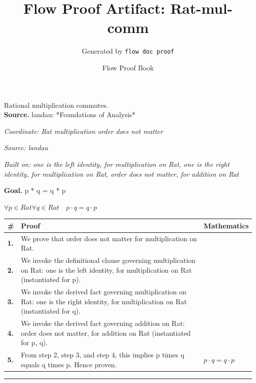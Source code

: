 \documentclass[11pt]{article}
\title{Flow Proof Artifact: Rat-mul-comm}
\author{Generated by \texttt{flow doc proof}}
\date{Flow Proof Book}
\theoremstyle{definition}
\begin{document}
\maketitle
Rational multiplication commutes.\\[0.5em]
\textbf{Source.} landau: *Foundations of Analysis*\\[0.5em]
\bigskip
{}\par
\smallskip\noindent\textit{Coordinate: Rat \cdot multiplication \cdot order does not matter}\par
\smallskip\noindent\textit{Source: landau}\par
\smallskip\noindent\textit{Built on: one is the left identity, for multiplication on Rat, one is the right identity, for multiplication on Rat, order does not matter, for addition on Rat}\par
\medskip
\noindent\textbf{Goal.} p * q = q * p\par
\noindent$\displaystyle \forall p \in Rat \forall q \in Rat\quad p \cdot q = q \cdot p$\par
\medskip
\noindent
\begin{tabular}{@{} >{\raggedright\arraybackslash}p{} >{\raggedright\arraybackslash}p{} >{\raggedleft\arraybackslash}p{} @{}}
\textbf{\#} & \textbf{Proof} & \textbf{Mathematics} \\
\midrule
\textbf{1.} & We prove that order does not matter for multiplication on Rat. & \\[0.45em]
\textbf{2.} & We invoke the definitional clause governing multiplication on Rat: one is the left identity, for multiplication on Rat (instantiated for p). & \\[0.45em]
\textbf{3.} & We invoke the derived fact governing multiplication on Rat: one is the right identity, for multiplication on Rat (instantiated for q). & \\[0.45em]
\textbf{4.} & We invoke the derived fact governing addition on Rat: order does not matter, for addition on Rat (instantiated for p, q). & \\[0.45em]
\textbf{5.} & From step 2, step 3, and step 4, this implies p times q equals q times p. Hence proven. & $\displaystyle p \cdot q = q \cdot p$ \\[0.45em]
\bottomrule
\end{tabular}
\label{thm:Rat-multiplication-order_does_not_matter}
\par\medskip\hrule
\end{document}
